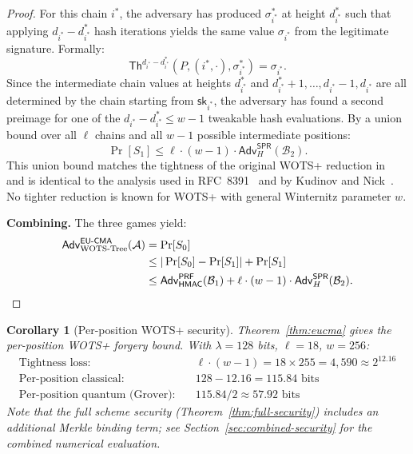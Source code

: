 \documentclass[11pt,a4paper]{article}
\newtheorem{corollary}[theorem]{Corollary}
\theoremstyle{definition}
\begin{document}
\begin{proof}
For this chain $i^*$, the adversary has produced $\sigma^*_{i^*}$ at height $d^*_{i^*}$ such that applying $d_{i^*} - d^*_{i^*}$ hash iterations yields the same value $\sigma_{i^*}$ from the legitimate signature. Formally:
$$
\mathsf{Th}^{d_{i^*} - d^*_{i^*}}(P, (i^*, \cdot), \sigma^*_{i^*}) = \sigma_{i^*}.
$$
Since the intermediate chain values at heights $d^*_{i^*}$ and $d^*_{i^*} + 1, \ldots, d_{i^*} - 1, d_{i^*}$ are all determined by the chain starting from $\mathsf{sk}_{i^*}$, the adversary has found a second preimage for one of the $d_{i^*} - d^*_{i^*} \leq w - 1$ tweakable hash evaluations. By a union bound over all $\ell$ chains and all $w - 1$ possible intermediate positions:
$$
\Pr[S_1] \leq \ell \cdot (w - 1) \cdot \mathsf{Adv}^{\mathsf{SPR}}_H(\mathcal{B}_2).
$$
This union bound matches the tightness of the original WOTS+ reduction in~\cite{hulsing2013wots} and is identical to the analysis used in RFC~8391~\cite{rfc8391} and by Kudinov and Nick~\cite{kudinov2025}. No tighter reduction is known for WOTS+ with general Winternitz parameter $w$.

\medskip\noindent\textbf{Combining.} The three games yield:
\begin{align*}
\mathsf{Adv}^{\mathsf{EU\text{-}CMA}}_{\mathrm{WOTS\text{-}Tree}}(\mathcal{A})
&= \Pr[S_0] \\
&\leq |\Pr[S_0] - \Pr[S_1]| + \Pr[S_1] \\
&\leq \mathsf{Adv}^{\mathsf{PRF}}_{\mathsf{HMAC}}(\mathcal{B}_1)
+ \ell \cdot (w-1) \cdot \mathsf{Adv}^{\mathsf{SPR}}_H(\mathcal{B}_2). \qedhere
\end{align*}
\end{proof}

\begin{corollary}[Per-position WOTS+ security]
\label{cor:concrete}
Theorem~\ref{thm:eucma} gives the \emph{per-position} WOTS+ forgery bound. With $\lambda = 128$ bits, $\ell = 18$, $w = 256$:
\begin{align*}
\text{Tightness loss:} \quad & \ell \cdot (w - 1) = 18 \times 255 = 4{,}590 \approx 2^{12.16} \\
\text{Per-position classical:} \quad & 128 - 12.16 = 115.84 \text{ bits} \\
\text{Per-position quantum (Grover):} \quad & 115.84 / 2 \approx 57.92 \text{ bits}
\end{align*}
Note that the full scheme security (Theorem~\ref{thm:full-security}) includes an additional Merkle binding term; see Section~\ref{sec:combined-security} for the combined numerical evaluation.
\end{corollary}
\end{document}
